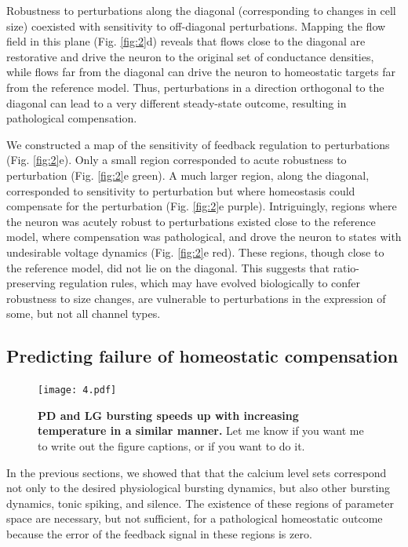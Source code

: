 \documentclass[9pt,lineno]{elife}
\begin{document}
Robustness to perturbations along the diagonal (corresponding to changes in cell size) coexisted with sensitivity to off-diagonal perturbations. Mapping the flow field in this plane (Fig. \ref{fig:2}d) reveals that flows close to the diagonal are restorative and drive the neuron to the original set of conductance densities, while flows far from the diagonal can drive the neuron to homeostatic targets far from the reference model. Thus, perturbations in a direction orthogonal to the diagonal can lead to a very different steady-state outcome, resulting in pathological compensation.

We constructed a map of the sensitivity of feedback regulation to perturbations (Fig. \ref{fig:2}e). Only a small region corresponded to acute robustness to perturbation (Fig. \ref{fig:2}e green). A much larger region, along the diagonal, corresponded to sensitivity to perturbation but where homeostasis could compensate for the perturbation (Fig. \ref{fig:2}e purple). Intriguingly, regions where the neuron was acutely robust to perturbations existed close to the reference model, where compensation was pathological, and drove the neuron to states with undesirable voltage dynamics (Fig. \ref{fig:2}e red). These regions, though close to the reference model, did not lie on the diagonal. This suggests that ratio-preserving regulation rules, which may have evolved biologically to confer robustness to size changes, are vulnerable to perturbations in the expression of some, but not all channel types. 


\subsection{Predicting failure of homeostatic compensation}

\begin{figure}[!hbp]
\centering
\begin{fullwidth}
\texttt{[image: 4.pdf]}
\end{fullwidth}
\caption{\textbf{PD and LG bursting speeds up with increasing temperature in a similar manner.} Let me know if you want me to write out the figure captions, or if you want to do it.   }
\end{figure}

In the previous sections, we showed that that the calcium level sets correspond not only to the desired physiological bursting dynamics, but also other bursting dynamics, tonic spiking, and silence. The existence of these regions of parameter space are necessary, but not sufficient, for a pathological homeostatic outcome because the error of the feedback signal in these regions is zero.
\end{document}

